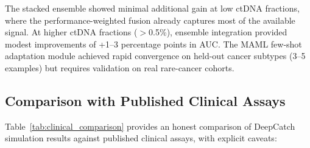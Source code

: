 \documentclass[10pt,a4paper]{article}
\begin{document}
The stacked ensemble showed minimal additional gain at low ctDNA fractions, where the performance-weighted fusion already captures most of the available signal. At higher ctDNA fractions ($>$0.5\%), ensemble integration provided modest improvements of +1--3 percentage points in AUC. The MAML few-shot adaptation module achieved rapid convergence on held-out cancer subtypes (3--5 examples) but requires validation on real rare-cancer cohorts.

\subsection{Comparison with Published Clinical Assays}

Table~\ref{tab:clinical_comparison} provides an honest comparison of DeepCatch simulation results against published clinical assays, with explicit caveats:
\end{document}
